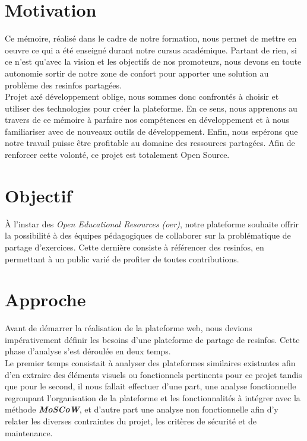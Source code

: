 \section*{Motivation}

Ce mémoire, réalisé dans le cadre de notre formation, nous permet de mettre en oeuvre ce qui a été enseigné durant notre cursus académique. Partant de rien, si ce n'est qu'avec la vision et les objectifs de nos promoteurs, nous devons en toute autonomie sortir de notre zone de confort pour apporter une solution au problème des \glspl{resinfo} partagées.\\

Projet axé développement oblige, nous sommes donc confrontés à choisir et utiliser des technologies pour créer la plateforme. En ce sens, nous apprenons au travers de ce mémoire à parfaire nos compétences en développement et à nous familiariser avec de nouveaux outils de développement.
Enfin, nous espérons que notre travail puisse être profitable au domaine des ressources partagées. Afin de renforcer cette volonté, ce projet est totalement Open Source.

\section*{Objectif}

À l’instar des \textit{Open Educational Resources (\Gls{oer})}, notre plateforme souhaite offrir la possibilité à des équipes pédagogiques de collaborer sur la problématique de partage d'exercices. Cette dernière consiste à référencer des \glspl{resinfo}, en permettant à un public varié de profiter de toutes contributions.\\

\section*{Approche}

Avant de démarrer la réalisation de la plateforme web, nous devions impérativement définir les besoins d'une plateforme de partage de \glspl{resinfo}. Cette phase d'analyse s'est déroulée en deux temps.\\

Le premier temps consistait à analyser des plateformes similaires existantes afin d'en extraire des éléments visuels ou fonctionnels pertinents pour ce projet tandis que pour le second, il nous fallait effectuer d'une part, une analyse fonctionnelle regroupant l'organisation de la plateforme et les fonctionnalités à intégrer avec la méthode \textit{\textbf{MoSCoW}}, et d'autre part une analyse non fonctionnelle afin d'y relater les diverses contraintes du projet, les critères de sécurité et de maintenance.\\

